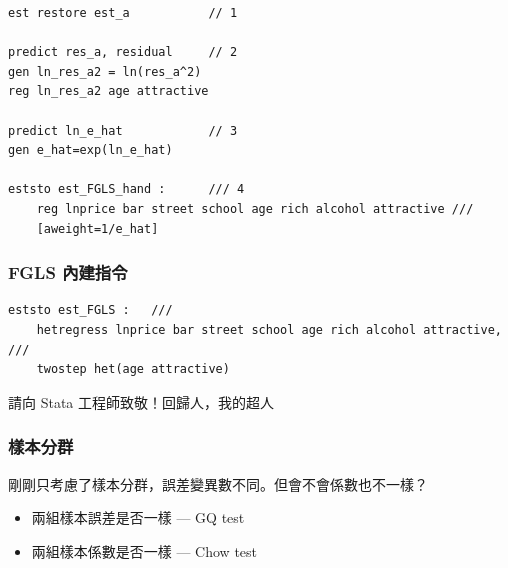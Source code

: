 \begin{frame}[fragile]

    \begin{lstlisting}
est restore est_a           // 1

predict res_a, residual     // 2
gen ln_res_a2 = ln(res_a^2)
reg ln_res_a2 age attractive

predict ln_e_hat            // 3
gen e_hat=exp(ln_e_hat)

eststo est_FGLS_hand :      /// 4
    reg lnprice bar street school age rich alcohol attractive ///
    [aweight=1/e_hat]\end{lstlisting}

\end{frame}

\begin{frame}[fragile]
    \frametitle{FGLS 內建指令}

    \begin{lstlisting}
eststo est_FGLS :   /// 
    hetregress lnprice bar street school age rich alcohol attractive, /// 
    twostep het(age attractive)
    \end{lstlisting}
    
\vfill
請向 Stata 工程師致敬！回歸人，我的超人 
\end{frame}

\begin{frame}
    \begin{table}
        \centering
        \scalebox{0.6}{
            
        }
    \end{table}
\end{frame}

\begin{frame}
    \frametitle{樣本分群}

    剛剛只考慮了樣本分群，誤差變異數不同。但會不會係數也不一樣？

    \begin{itemize}
        \item 兩組樣本誤差是否一樣 --- GQ test
        \item 兩組樣本係數是否一樣 --- Chow test
    \end{itemize}
\end{frame}

\begin{frame}
    \begin{table}
        \centering
        \scalebox{0.7}{
        
        }
    \end{table}
\end{frame}

